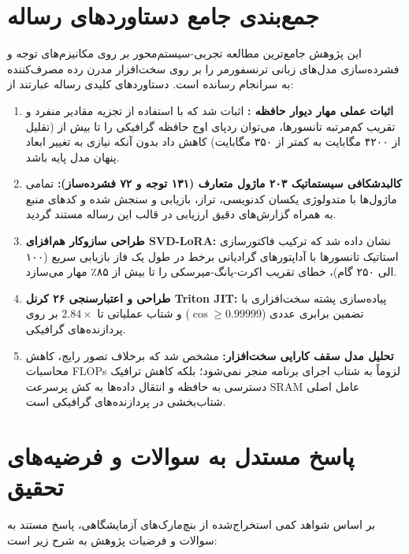 \documentclass[12pt,a4paper]{report}
\theoremstyle{definition}
\begin{document}
\section{جمع‌بندی جامع دستاوردهای رساله}
این پژوهش جامع‌ترین مطالعه تجربی-سیستم‌محور بر روی مکانیزم‌های توجه و فشرده‌سازی مدل‌های زبانی ترنسفورمر را بر روی سخت‌افزار مدرن رده مصرف‌کننده به سرانجام رسانده است. دستاوردهای کلیدی رساله عبارتند از:
\begin{enumerate}
    \item \textbf{اثبات عملی مهار دیوار حافظه :} اثبات شد که با استفاده از تجزیه مقادیر منفرد و تقریب کم‌مرتبه تانسورها، می‌توان ردپای اوج حافظه گرافیکی را تا بیش از  (تقلیل از ۴۲۰۰ مگابایت به کمتر از ۳۵۰ مگابایت) کاهش داد بدون آنکه نیازی به تغییر ابعاد پنهان مدل پایه باشد.
    \item \textbf{کالبدشکافی سیستماتیک ۲۰۳ ماژول متعارف (۱۳۱ توجه و ۷۲ فشرده‌ساز):} تمامی ماژول‌ها با متدولوژی یکسان کدنویسی، تراز، بازیابی و سنجش شده و کدهای منبع به همراه گزارش‌های دقیق ارزیابی در قالب این رساله مستند گردید.
    \item \textbf{طراحی سازوکار هم‌افزای SVD-LoRA:} نشان داده شد که ترکیب فاکتورسازی استاتیک تانسورها با آداپتورهای گرادیانی برخط در طول یک فاز بازیابی سریع (۱۰۰ الی ۲۵۰ گام)، خطای تقریب اکرت-یانگ-میرسکی را تا بیش از ۸۵٪ مهار می‌سازد.
    \item \textbf{طراحی و اعتبارسنجی ۲۶ کرنل Triton JIT:} پیاده‌سازی پشته سخت‌افزاری با تضمین برابری عددی ($\cos \ge 0.99999$) و شتاب عملیاتی تا $2.84\times$ بر روی پردازنده‌های گرافیکی.
    \item \textbf{تحلیل مدل سقف کارایی سخت‌افزار:} مشخص شد که برخلاف تصور رایج، کاهش محاسبات FLOPs لزوماً به شتاب اجرای برنامه منجر نمی‌شود؛ بلکه کاهش ترافیک دسترسی به حافظه و انتقال داده‌ها به کش پرسرعت SRAM عامل اصلی شتاب‌بخشی در پردازنده‌های گرافیکی است.
\end{enumerate}

\section{پاسخ مستدل به سوالات و فرضیه‌های تحقیق}
بر اساس شواهد کمی استخراج‌شده از بنچ‌مارک‌های آزمایشگاهی، پاسخ مستند به سوالات و فرضیات پژوهش به شرح زیر است:
\end{document}
